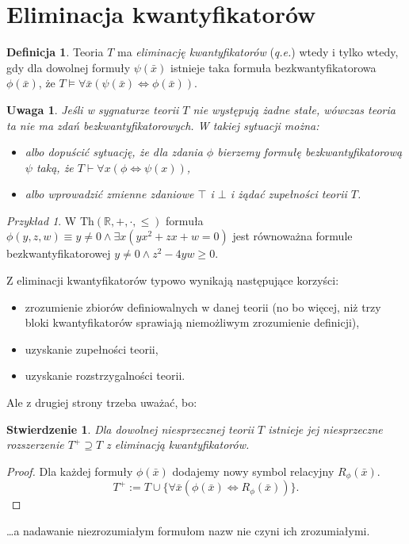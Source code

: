 \documentclass{article}
\newcommand{\R}{\mathbb{R}}
\theoremstyle{plain}
\newtheorem{stw}[thm]{Stwierdzenie}
\newtheorem{uw}[thm]{Uwaga}
\theoremstyle{definition}
\newtheorem{df}[thm]{Definicja}
\theoremstyle{remark}
\newtheorem{prz}[thm]{Przykład}
\newcommand{\wtw}{wtedy i tylko wtedy, gdy }
\newcommand{\Th}{\text{Th}}
\begin{document}
\section{Eliminacja kwantyfikatorów}
\begin{df}
	Teoria $T$ ma \textit{eliminację kwantyfikatorów} (\textit{q.e.}) \wtw dla
	dowolnej formuły $\psi(\bar{x})$ istnieje taka formuła
	bezkwantyfikatorowa $\phi(\bar{x})$, że $T \models \forall {\bar{x}}
	(\psi(\bar{x}) \iff \phi(\bar{x}))$.
\end{df}

\begin{uw}
	Jeśli w sygnaturze teorii $T$ nie występują żadne stałe, wówczas teoria
	ta nie ma zdań bezkwantyfikatorowych.  W takiej sytuacji można:
	\begin{itemize}
		\item albo dopuścić sytuację, że dla zdania $\phi$ bierzemy
			formułę bezkwantyfikatorową $\psi$ taką, że $T \vdash
			\forall x (\phi \iff \psi(x))$,
		\item albo wprowadzić zmienne zdaniowe $\top$ i $\bot$ i żądać
			zupełności teorii $T$.
	\end{itemize}
\end{uw}

\begin{prz}
	W $\Th(\R, +, \cdot, \leq)$ formuła $\phi(y, z, w) \equiv y \neq 0
	\wedge \exists x (yx^2 + zx + w = 0)$ jest równoważna formule
	bezkwantyfikatorowej $y \neq 0 \wedge z^2 - 4yw \geq 0$.
\end{prz}

Z eliminacji kwantyfikatorów typowo wynikają następujące korzyści:
\begin{itemize}
	\item zrozumienie zbiorów definiowalnych w danej teorii (no bo więcej,
		niż trzy bloki kwantyfikatorów sprawiają niemożliwym
		zrozumienie definicji),
	\item uzyskanie zupełności teorii,
	\item uzyskanie rozstrzygalności teorii.
\end{itemize}

Ale z drugiej strony trzeba uważać, bo:

\begin{stw} Dla dowolnej niesprzecznej teorii $T$ istnieje jej niesprzeczne
	rozszerzenie $T^+ \supseteq T$ z eliminacją kwantyfikatorów.
\end{stw}
\begin{proof}
	Dla każdej formuły $\phi(\bar{x})$ dodajemy nowy symbol relacyjny
	$R_{\phi}(\bar{x}).$
	\[T^+ := T \cup \{\forall \bar{x} (\phi(\bar{x}) \iff
	R_{\phi}(\bar{x}))\}.\]
\end{proof}
\ldots a nadawanie niezrozumiałym formułom nazw nie czyni ich zrozumiałymi.
\end{document}
